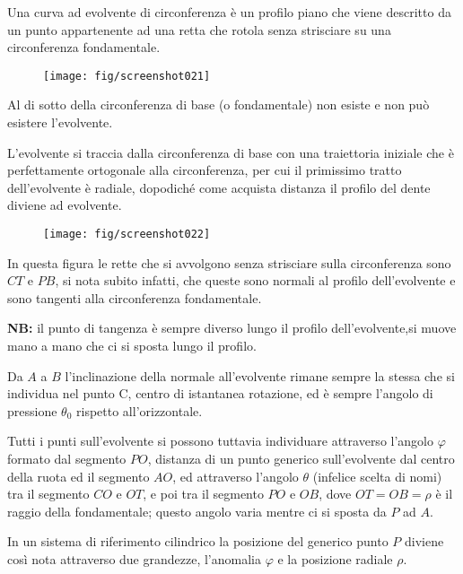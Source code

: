 \documentclass[a4paper, 15pt]{article}
\begin{document}
	\begin{adjustwidth}{2in}{}	
		Una curva ad evolvente di circonferenza è un profilo piano che viene descritto da un punto appartenente ad una retta che rotola senza strisciare su  una circonferenza fondamentale. 
		\begin{figure}[H]
			\centering
			\texttt{[image: fig/screenshot021]}
			\label{fig:screenshot021}
		\end{figure}
		Al di sotto della circonferenza di base (o fondamentale) non esiste e non può esistere l'evolvente. 
		
		L'evolvente si traccia dalla circonferenza di base con una traiettoria iniziale che è perfettamente ortogonale alla circonferenza, per cui il primissimo tratto dell'evolvente è radiale, dopodiché come acquista distanza il profilo del dente diviene ad evolvente.
		\begin{figure}[H]
			\centering
			\texttt{[image: fig/screenshot022]}
			\label{fig:screenshot022}
		\end{figure}
		In questa figura le rette che si avvolgono senza strisciare sulla circonferenza sono $CT$ e $PB$, si nota subito infatti, che queste sono normali al profilo dell'evolvente e sono tangenti alla circonferenza fondamentale.
		
		\textbf{NB:} il punto di tangenza è sempre diverso lungo il profilo dell'evolvente,si muove mano a mano che ci si sposta lungo  il profilo.\newline  
		
		Da $A$ a $B$ l'inclinazione della normale all'evolvente rimane sempre la stessa che si individua nel punto C, centro di istantanea rotazione, ed è sempre l'angolo di pressione $\theta_0$ rispetto all'orizzontale.
		
		Tutti i punti sull'evolvente si possono tuttavia individuare attraverso l'angolo $\varphi$ formato dal segmento $PO$, distanza di un punto generico sull'evolvente dal centro della ruota ed il segmento $AO$, ed attraverso l'angolo $\theta$ (infelice scelta di nomi) tra il segmento $CO$ e $OT$, e poi tra il segmento $PO$ e $OB$, dove $OT=OB=\rho$ è il raggio della fondamentale; questo angolo varia mentre ci si sposta da $P$ ad $A$.
		
		In un sistema di riferimento cilindrico la posizione del generico punto $P$ diviene così nota attraverso due grandezze, l'anomalia $\varphi$ e la posizione radiale $\rho$.
	\end{adjustwidth}
\end{document}
